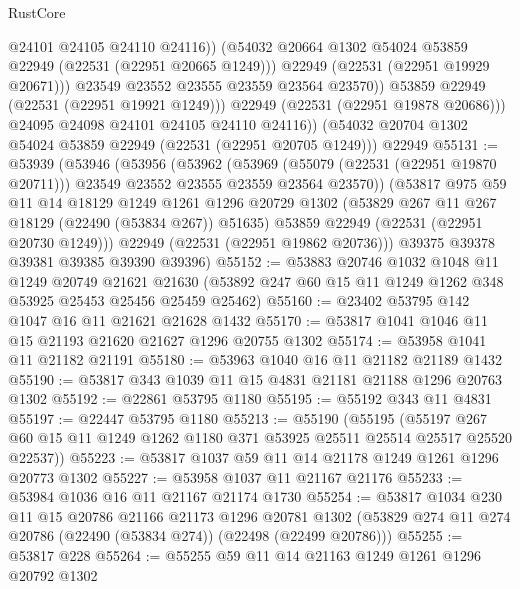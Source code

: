 \begin{lexlean}{RustCore}
\begin{coremodule}
                      @24101
                      @24105
                      @24110
                      @24116))
                  (@54032 @20664 @1302 @54024 @53859 @22949 (@22531 (@22951 @20665 @1249)))
                  @22949
                  (@22531 (@22951 @19929 @20671)))
                @23549
                @23552
                @23555
                @23559
                @23564
                @23570))
            @53859
            @22949
            (@22531 (@22951 @19921 @1249)))
          @22949
          (@22531 (@22951 @19878 @20686)))
        @24095
        @24098
        @24101
        @24105
        @24110
        @24116))
    (@54032 @20704 @1302 @54024 @53859 @22949 (@22531 (@22951 @20705 @1249)))
    @22949
@55131 := @53939
    (@53946
      (@53956
        (@53962
          (@53969
            (@55079 (@22531 (@22951 @19870 @20711)))
            @23549
            @23552
            @23555
            @23559
            @23564
            @23570))
        (@53817
          @975
          @59
          @11
          @14
          @18129
          @1249
          @1261
          @1296
          @20729
          @1302
          (@53829 @267 @11 @267 @18129 (@22490 (@53834 @267)) @51635)
          @53859
          @22949
          (@22531 (@22951 @20730 @1249)))
        @22949
        (@22531 (@22951 @19862 @20736)))
      @39375
      @39378
      @39381
      @39385
      @39390
      @39396)
@55152 := @53883
    @20746
    @1032
    @1048
    @11
    @1249
    @20749
    @21621
    @21630
    (@53892 @247 @60 @15 @11 @1249 @1262 @348 @53925 @25453 @25456 @25459 @25462)
@55160 := @23402 @53795 @142 @1047 @16 @11 @21621 @21628 @1432
@55170 := @53817 @1041 @1046 @11 @15 @21193 @21620 @21627 @1296 @20755 @1302
@55174 := @53958 @1041 @11 @21182 @21191
@55180 := @53963 @1040 @16 @11 @21182 @21189 @1432
@55190 := @53817 @343 @1039 @11 @15 @4831 @21181 @21188 @1296 @20763 @1302
@55192 := @22861 @53795 @1180
@55195 := @55192 @343 @11 @4831
@55197 := @22447 @53795 @1180
@55213 := @55190
    (@55195
      (@55197 @267 @60 @15 @11 @1249 @1262 @1180 @371 @53925 @25511 @25514 @25517 @25520 @22537))
@55223 := @53817 @1037 @59 @11 @14 @21178 @1249 @1261 @1296 @20773 @1302
@55227 := @53958 @1037 @11 @21167 @21176
@55233 := @53984 @1036 @16 @11 @21167 @21174 @1730
@55254 := @53817
    @1034
    @230
    @11
    @15
    @20786
    @21166
    @21173
    @1296
    @20781
    @1302
    (@53829 @274 @11 @274 @20786 (@22490 (@53834 @274)) (@22498 (@22499 @20786)))
@55255 := @53817 @228
@55264 := @55255 @59 @11 @14 @21163 @1249 @1261 @1296 @20792 @1302

\end{coremodule}
\end{lexlean}
